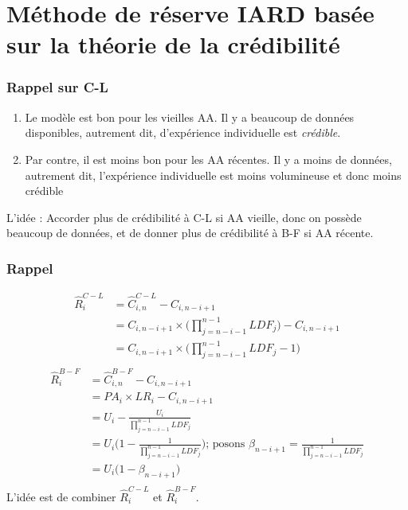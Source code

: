 \section{Méthode de réserve IARD basée sur la théorie de la crédibilité}

\subsubsection*{Rappel sur C-L }
\begin{enumerate}
\item Le modèle est  bon pour les vieilles AA. Il y a beaucoup de données disponibles, autrement dit, d'expérience individuelle est \textit{crédible}.
\item Par contre, il est moins bon pour les AA récentes. Il y a moins de données, autrement dit, l'expérience individuelle est moins volumineuse et donc moins crédible 
\end{enumerate}
L'idée : Accorder plus de crédibilité à C-L si AA vieille, donc on possède beaucoup de données, et de donner plus de crédibilité à B-F si AA récente.

\subsubsection*{Rappel}
\begin{align*}
\widehat{R}_i^{C-L} &= \widehat{C}_{i,n}^{C-L} - C_{i, n-i+1} \\
&= C_{i,n-i+1} \times \Big(\prod_{j=n-i-1}^{n-1} LDF_j \Big) - C_{i,n-i+1}\\
&= C_{i,n-i+1} \times \Big(\prod_{j=n-i-1}^{n-1} LDF_j - 1 \Big) \\
\end{align*}
\begin{align*}
\widehat{R}_i^{B-F} &= \widehat{C}_{i,n}^{B-F} - C_{i, n-i+1} \\
&= PA_i \times LR_i  - C_{i, n-i+1}\\
&= U_i - \frac{U_i}{\prod_{j=n-i-1}^{n-1} LDF_j}\\
&= U_i \Bigg( 1 - \frac{1}{\prod_{j=n-i-1}^{n-1} LDF_j} \Bigg) \text{; posons } \beta_{n-i+1} = \frac{1}{\prod_{j=n-i-1}^{n-1} LDF_j}\\
&= U_i \Bigg( 1 - \beta_{n-i+1} \Bigg) \\
\end{align*}
L'idée est de combiner $\widehat{R}_i^{C-L}$  et $\widehat{R}_i^{B-F}$.

